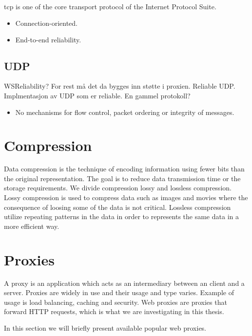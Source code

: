 \subsection{}
\gls{tcp} is one of the core transport protocol of the Internet Protocol Suite.
\begin{itemize}
    \item Connection-oriented.
    \item End-to-end reliability.
\end{itemize}

\subsection{UDP}
WSReliability? For rest må det da bygges inn støtte i proxien.
Reliable UDP. Implmentasjon av UDP som er reliable. En gammel protokoll?
\begin{itemize}
    \item No mechanisms for flow control, packet ordering or integrity of
    messages.
\end{itemize}


\section{Compression}

Data compression is the technique of encoding information using fewer bits than
the original representation. The goal is to reduce data transmission time or the
storage requirements. We divide compression lossy and lossless compression.
Lossy compression is used to compress data such as images and movies where the
consequence of loosing some of the data is not critical. Lossless compression
utilize repeating patterns in the  data in order to represents the same data in
a more efficient way.

\section{Proxies}

A proxy is an application which acts as an intermediary between an client and a
server. Proxies are widely in use and their usage and type varies. Example of
usage is load balancing, caching and security. Web proxies are proxies that
forward HTTP requests, which is what we are investigating in this thesis.

In this section we will briefly present available popular web proxies.


